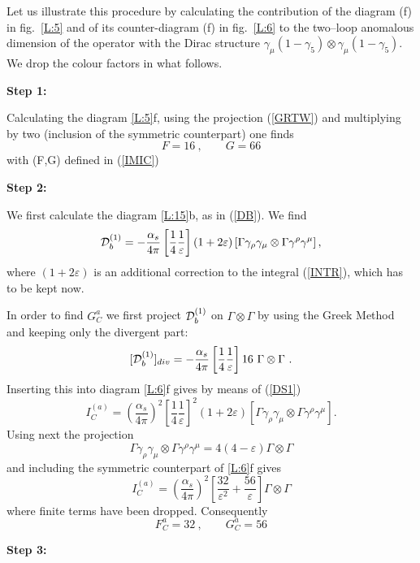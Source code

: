 \documentclass[12pt,rotate]{article}
\def\as{\alpha_s}
\newcommand{\be}{\begin{equation}}
\newcommand{\ee}{\end{equation}}
\begin{document}
\begin{itemize}
\begin{itemize}
Let us illustrate this procedure by calculating the contribution 
of the diagram (f) in fig.~\ref{L:5} and of its counter-diagram (f)
in fig.~\ref{L:6} to the two--loop anomalous dimension of the
operator with the Dirac structure 
$\gamma_\mu(1-\gamma_5)\otimes\gamma_\mu(1-\gamma_5)$.
We drop the colour factors in what follows.

{\bf Step 1:}

Calculating the diagram \ref{L:5}f, using the projection
(\ref{GRTW}) and multiplying by two (inclusion of the symmetric
counterpart) one finds \cite{WEISZ}
\be\label{66}
F=16~, \quad\quad G=66
\ee
with (F,G) defined in (\ref{IMIC})

{\bf Step 2:}

We first calculate the diagram \ref{L:15}b, as in (\ref{DB}).
We find
\be\label{DS1}
{\cal D}^{(1)}_b=-\frac{\as}{4\pi}
\left[\frac{1}{4}\frac{1}{\varepsilon}\right]
(1+2\varepsilon)
\left[\Gamma\gamma_\rho\gamma_\mu\otimes\Gamma\gamma^\rho\gamma^\mu\right],
\ee
where $(1+2\varepsilon)$ is an additional correction to the integral
(\ref{INTR}), which has to be kept now.

In order to find $G^a_C$ we first project ${\cal D}^{(1)}_b$
on $\Gamma\otimes\Gamma$ by using the Greek Method and keeping
only the divergent part:
\be\label{DS2}
[{\cal D}^{(1)}_b]_{div}=-\frac{\as}{4\pi}
\left[\frac{1}{4}\frac{1}{\varepsilon}\right] 16~\Gamma\otimes\Gamma~.
\ee
Inserting this into diagram \ref{L:6}f gives by means of (\ref{DS1})
\be\label{DS3}
I^{(a)}_C=\left(\frac{\as}{4\pi}\right)^2
\left[\frac{1}{4}\frac{1}{\varepsilon}\right]^2
(1+2\varepsilon)
\left[\Gamma\gamma_\rho\gamma_\mu\otimes\Gamma\gamma^\rho\gamma^\mu\right].
\ee
Using next the projection
\be\label{DS4}
\Gamma\gamma_\rho\gamma_\mu\otimes\Gamma\gamma^\rho\gamma^\mu=
4(4-\varepsilon) \Gamma\otimes\Gamma
\ee
and including the symmetric counterpart of \ref{L:6}f gives
\be\label{DS5}
I^{(a)}_C=\left(\frac{\as}{4\pi}\right)^2
\left[\frac{32}{\varepsilon^2}+\frac{56}{\varepsilon}\right]
\Gamma\otimes\Gamma
\ee
where finite terms have been dropped. Consequently
\be\label{DS6}
F_C^a=32~, \quad\quad G_C^a=56
\ee

{\bf Step 3:}


\end{itemize}
\end{itemize}
\end{document}
